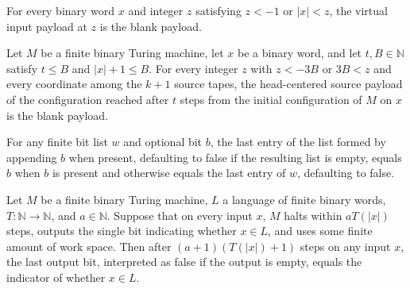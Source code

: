 \begin{lemma}
\label{Complexity.inputPayload_outside}
\leanok
{}
For every binary word $x$ and integer $z$ satisfying $z<-1$ or $|x|<z$, the virtual
input payload at $z$ is the blank payload.
\end{lemma}

\begin{lemma}
\label{Complexity.sourcePayload_support}
\leanok
{}
Let $M$ be a finite binary Turing machine, let $x$ be a binary word, and let
$t,B\in\mathbb{N}$ satisfy $t\le B$ and $|x|+1\le B$. For every integer $z$ with $z<-3B$
or $3B<z$ and every coordinate among the $k+1$ source tapes, the head-centered source
payload of the configuration reached after $t$ steps from the initial configuration of
$M$ on $x$ is the blank payload.
\end{lemma}

\begin{lemma}
\label{Complexity.lastOutput_append}
\leanok
{}
For any finite bit list $w$ and optional bit $b$, the last entry of the list formed by
appending $b$ when present, defaulting to false if the resulting list is empty, equals
$b$ when $b$ is present and otherwise equals the last entry of $w$, defaulting to false.
\end{lemma}

\begin{lemma}
\label{Complexity.sourceAnswer_at_budget}
\leanok
{}
Let $M$ be a finite binary Turing machine, $L$ a language of finite binary words,
$T:\mathbb{N}\to\mathbb{N}$, and $a\in\mathbb{N}$. Suppose that on every input $x$, $M$
halts within $aT(|x|)$ steps, outputs the single bit indicating whether $x\in L$, and
uses some finite amount of work space. Then after $(a+1)(T(|x|)+1)$ steps on any input
$x$, the last output bit, interpreted as false if the output is empty, equals the
indicator of whether $x\in L$.
\end{lemma}

